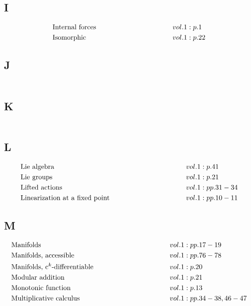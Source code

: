 \documentclass[a4paper]{article}
\begin{document}
\subsection*{I} 
\begin{align*} 
&\text{Internal forces} \hspace*{10em}&& vol. 1: p. 1\\
&\text{Isomorphic} \hspace*{10em}&& vol. 1: p. 22\\
\end{align*} 
\subsection*{J} 
\begin{align*} 
\end{align*} 
\subsection*{K} 
\begin{align*} 
\end{align*} 
\subsection*{L} 
\begin{align*} 
&\text{Lie algebra} \hspace*{10em}&& vol. 1: p. 41\\
&\text{Lie groups} \hspace*{10em}&& vol. 1: p. 21\\
&\text{Lifted actions} \hspace*{10em}&& vol. 1: pp. 31-34\\
&\text{Linearization at a fixed point} \hspace*{10em}&& vol. 1: pp. 10-11\\
\end{align*} 
\subsection*{M} 
\begin{align*} 
&\text{Manifolds} \hspace*{10em}&& vol. 1: pp. 17-19\\
&\text{Manifolds, accessible} \hspace*{10em}&& vol. 1: pp. 76-78\\
&\text{Manifolds, c$^k$-differentiable} \hspace*{10em}&& vol. 1: p. 20\\
&\text{Modular addition} \hspace*{10em}&& vol. 1: p. 21\\
&\text{Monotonic function} \hspace*{10em}&& vol. 1: p. 13\\
&\text{Multiplicative calculus} \hspace*{10em}&& vol. 1: pp. 34-38, 46-47\\
\end{align*} 
\end{document}
